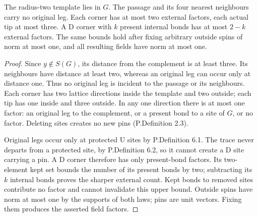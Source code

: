 \begin{htlem}\label{ht:counts}
The radius-two template lies in \(G\). The passage and its four nearest
neighbours carry no original leg. Each corner has at most two external
factors, each actual tip at most three. A D corner with \(k\) present
internal bonds has at most \(2-k\) external factors. The same bounds
hold after fixing arbitrary outside spins of norm at most one, and
all resulting fields have norm at most one.
\end{htlem}
\begin{proof}
Since \(y\notin S(G)\), its distance from the complement is at least
three. Its neighbours have distance at least two, whereas an original
leg can occur only at distance one. Thus no original leg is incident
to the passage or its neighbours. Each corner has two lattice directions
inside the template and two outside; each tip has one inside and three
outside. In any one direction there is at most one factor: an original
leg to the complement, or a present bond to a site of \(G\), or no factor.
Deleting sites creates no new pins (P.Definition 2.3).

Original legs occur only at protected U sites by P.Definition 6.1.
The trace never departs from a protected site, by P.Definition 6.2,
so it cannot create a D site carrying a pin. A D corner therefore has
only present-bond factors. Its two-element kept set bounds the number
of its present bonds by two; subtracting its \(k\) internal bonds proves
the sharper external count. Kept bonds to removed sites contribute no
factor and cannot invalidate this upper bound. Outside spins have norm
at most one by the supports of both laws; pins are unit vectors.
Fixing them produces the asserted field factors.
\end{proof}

